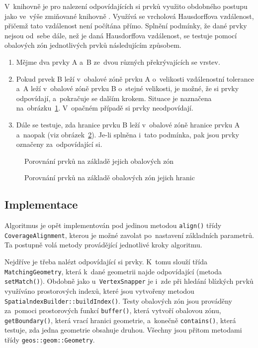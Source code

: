 V~knihovně  je pro nalezení odpovídajících si prvků využito 
obdobného postupu jako ve~výše zmiňované knihovně . Využívá 
se vrcholová Hausdorffova vzdálenost, přičemž tato vzdálenost není počítána 
přímo. Splnění podmínky, že dané prvky nejsou od~sebe dále, než je daná 
Hausdorffova vzdálenost, se testuje pomocí obalových zón jednotlivých prvků 
následujícím způsobem.

\begin{enumerate}
 \item Mějme dva prvky A a~B ze~dvou různých překrývajících se vrstev.
 \item Pokud prvek B leží v~obalové zóně prvku A o~velikosti vzdálenostní 
    tolerance a~A leží v~obalové zóně prvku B o~stejné velikosti, je možné, 
    že si prvky odpovídají, a~pokračuje se dalším krokem. Situace je naznačena
    na~obrázku~\ref{fig:buffer}. V~opačném případě si prvky neodpovídají.
 \item Dále se testuje, zda hranice prvku B leží v~obalové zóně hranice prvku
    A a~naopak (viz obrázek~\ref{fig:buffer-boundary}). Je-li splněna i~tato 
    podmínka, pak jsou prvky označeny za~odpovídající si.
\end{enumerate}

  \begin{figure}[ht]
    \centering
      \small
      \def\svgwidth{390pt}
      
      \caption{Porovnání prvků na základě jejich obalových zón}
      \label{fig:buffer}
  \end{figure}

  \begin{figure}[ht]
    \centering
      \small
      \def\svgwidth{400pt}
      
      \caption{Porovnání prvků na základě obalových zón jejich hranic}
      \label{fig:buffer-boundary}
  \end{figure}

\subsection{Implementace}
\label{ca-implementace}
Algoritmus je opět implementován pod jedinou metodou \texttt{align()} 
třídy \texttt{Coverage\-Alignment}, kterou je možné zavolat po~nastavení
základních parametrů. Ta po\-stupně volá metody provádějící jednotlivé
kroky algoritmu.

Nejdříve je třeba nalézt odpovídající si prvky. K~tomu slouží třída 
\texttt{Matching\-Geometry}, která k~dané geometrii najde odpovídající
(metoda \texttt{set\-Match()}). Obdobně jako u~\texttt{Vertex\-Snapper} je i~zde 
při hledání blízkých prvků využíváno prostoro\-vých indexů, které jsou 
vytvořeny metodou \texttt{SpatialndexBuilder::build\-Index()}. Testy
obalových zón jsou prováděny za~pomoci prostorových funkcí 
\texttt{buffer()}, která vytvoří obalovou zónu, \texttt{getBoundary()},
která vrací hranici geometrie, a~konečně \texttt{contains()}, která
testuje, zda jedna geometrie obsahuje druhou. Všechny jsou přitom
metodami třídy \texttt{geos::geom::Geometry}.


